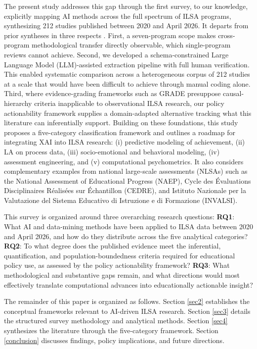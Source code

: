 \documentclass{ieeeaccess}
\begin{document}
The present study addresses this gap through the first survey, to our knowledge, explicitly mapping AI methods across the full spectrum of ILSA programs, synthesizing 212 studies published between 2020 and April 2026. It departs from prior syntheses in three respects \cite{hernandez-torrano-courtney2021, maia-etal023, anghel-etal2024, huang-etal2025}. First, a seven-program scope makes cross-program methodological transfer directly observable, which single-program reviews cannot achieve. Second, we developed a schema-constrained Large Language Model (LLM)-assisted extraction pipeline with full human verification. This enabled systematic comparison across a heterogeneous corpus of 212 studies at a scale that would have been difficult to achieve through manual coding alone. Third, where evidence-grading frameworks such as GRADE presuppose causal-hierarchy criteria inapplicable to observational ILSA research, our policy actionability framework supplies a domain-adapted alternative tracking what this literature can inferentially support. Building on these foundations, this study proposes a five-category classification framework and outlines a roadmap for integrating XAI into ILSA research: (i) predictive modeling of achievement, (ii) LA on process data, (iii) socio-emotional and behavioral modeling, (iv) assessment engineering, and (v) computational psychometrics. It also considers complementary examples from national large-scale assessments (NLSAs) such as the National Assessment of Educational Progress (NAEP), Cycle des Évaluations Disciplinaires Réalisées sur Échantillon (CEDRE), and Istituto Nazionale per la Valutazione del Sistema Educativo di Istruzione e di Formazione (INVALSI).

This survey is organized around three overarching research questions: \textbf{RQ1}: What AI and data-mining methods have been applied to ILSA data between 2020 and April 2026, and how do they distribute across the five analytical categories? \textbf{RQ2}: To what degree does the published evidence meet the inferential, quantification, and population-boundedness criteria required for educational policy use, as assessed by the policy actionability framework? \textbf{RQ3}: What methodological and substantive gaps remain, and what directions would most effectively translate computational advances into educationally actionable insight?

The remainder of this paper is organized as follows. Section \ref{sec2} establishes the conceptual frameworks relevant to AI-driven ILSA research. Section \ref{sec3} details the structured survey methodology and analytical methods. Section \ref{sec4} synthesizes the literature through the five-category framework. Section \ref{conclusion} discusses findings, policy implications, and future directions.
\end{document}
